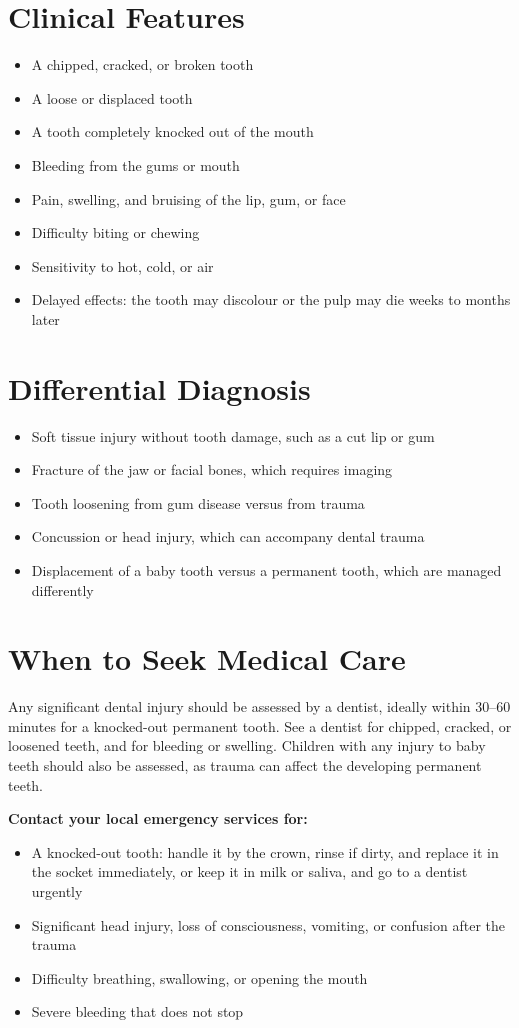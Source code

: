 \section*{Clinical Features}
\begin{itemize}
    \item A chipped, cracked, or broken tooth
    \item A loose or displaced tooth
    \item A tooth completely knocked out of the mouth
    \item Bleeding from the gums or mouth
    \item Pain, swelling, and bruising of the lip, gum, or face
    \item Difficulty biting or chewing
    \item Sensitivity to hot, cold, or air
    \item Delayed effects: the tooth may discolour or the pulp may die weeks to months later
\end{itemize}

\section*{Differential Diagnosis}
\begin{itemize}
    \item Soft tissue injury without tooth damage, such as a cut lip or gum
    \item Fracture of the jaw or facial bones, which requires imaging
    \item Tooth loosening from gum disease versus from trauma
    \item Concussion or head injury, which can accompany dental trauma
    \item Displacement of a baby tooth versus a permanent tooth, which are managed differently
\end{itemize}

\section*{When to Seek Medical Care}
Any significant dental injury should be assessed by a dentist, ideally within 30--60 minutes for a knocked-out permanent tooth. See a dentist for chipped, cracked, or loosened teeth, and for bleeding or swelling. Children with any injury to baby teeth should also be assessed, as trauma can affect the developing permanent teeth.

\textbf{Contact your local emergency services for:}
\begin{itemize}
    \item A knocked-out tooth: handle it by the crown, rinse if dirty, and replace it in the socket immediately, or keep it in milk or saliva, and go to a dentist urgently
    \item Significant head injury, loss of consciousness, vomiting, or confusion after the trauma
    \item Difficulty breathing, swallowing, or opening the mouth
    \item Severe bleeding that does not stop
\end{itemize}

